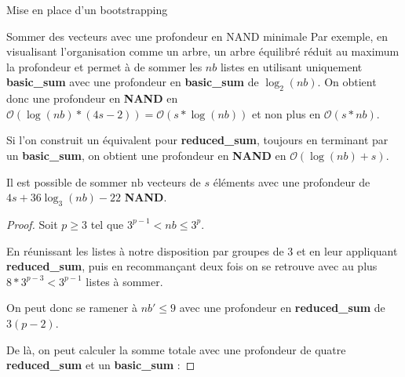 \begin{section}{Mise en place d'un bootstrapping}
\begin{subsection}{Sommer des vecteurs avec une profondeur en NAND minimale}
	Par exemple, en visualisant l'organisation comme un arbre, un arbre équilibré réduit au maximum la profondeur et permet à de sommer les $nb$ listes en utilisant uniquement \textbf{basic\_sum} avec une profondeur en \textbf{basic\_sum} de $\log_2(nb)$. On obtient donc une profondeur en \textbf{NAND} en $\mathcal{O}(\log(nb) * (4s - 2)) = \mathcal{O}(s * \log(nb))$ et non plus en $\mathcal{O}(s * nb)$.

	Si l'on construit un équivalent pour \textbf{reduced\_sum}, toujours en terminant par un \textbf{basic\_sum}, on obtient une profondeur en \textbf{NAND} en $\mathcal{O}(\log(nb) + s)$.

\begin{prop}
	Il est possible de sommer $\text{nb}$ vecteurs de $s$ éléments avec une profondeur de $4s + 36\log_3(nb) -22$ \textbf{NAND}.
\end{prop}

\begin{proof}
	Soit $p \geqslant 3$ tel que $3^{p-1} < nb \leqslant 3^{p}$.
	
	En réunissant les listes à notre disposition par groupes de 3 et en leur appliquant \textbf{reduced\_sum}, puis en recommançant deux fois on se retrouve avec au plus $8 * 3^{p-3} < 3^{p-1}$ listes à sommer.
	
	On peut donc se ramener à $nb' \leqslant 9$ avec une profondeur en \textbf{reduced\_sum} de $3(p - 2)$.
	
	De là, on peut calculer la somme totale avec une profondeur de quatre \textbf{reduced\_sum} et un \textbf{basic\_sum} :

\center
{}
\end{proof}
\end{subsection}
\end{section}
